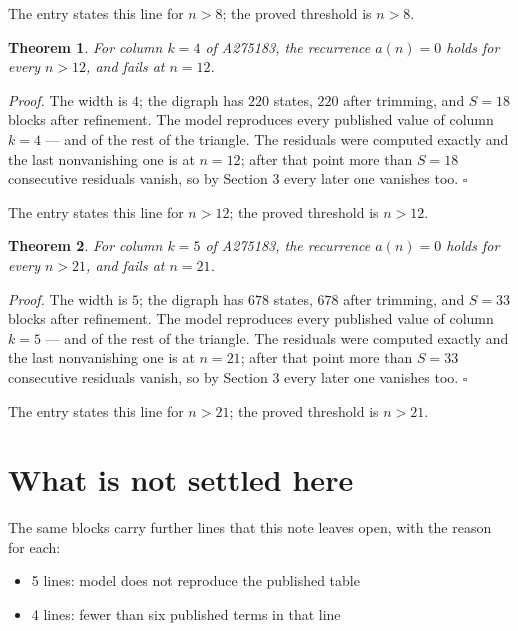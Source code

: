 \documentclass[11pt]{article}
\newtheorem{theorem}{Theorem}
\theoremstyle{definition}
\begin{document}
The entry states this line for $n > 8$; the proved threshold is $n > 8$.

\begin{theorem} For column $k = 4$ of A275183, the recurrence $a(n) = 0$ holds for every $n > 12$, and fails at $n = 12$.\end{theorem}

{\itshape Proof.} The width is $4$; the digraph has $220$ states, $220$ after trimming, and $S = 18$ blocks after refinement. The model reproduces every published value of column $k = 4$ --- and of the rest of the triangle. The residuals were computed exactly and the last nonvanishing one is at $n = 12$; after that point more than $S = 18$ consecutive residuals vanish, so by Section 3 every later one vanishes too. $\square$

The entry states this line for $n > 12$; the proved threshold is $n > 12$.

\begin{theorem} For column $k = 5$ of A275183, the recurrence $a(n) = 0$ holds for every $n > 21$, and fails at $n = 21$.\end{theorem}

{\itshape Proof.} The width is $5$; the digraph has $678$ states, $678$ after trimming, and $S = 33$ blocks after refinement. The model reproduces every published value of column $k = 5$ --- and of the rest of the triangle. The residuals were computed exactly and the last nonvanishing one is at $n = 21$; after that point more than $S = 33$ consecutive residuals vanish, so by Section 3 every later one vanishes too. $\square$

The entry states this line for $n > 21$; the proved threshold is $n > 21$.

\section{What is not settled here}

The same blocks carry further lines that this note leaves open, with the reason for each:

\begin{itemize}

\item 5 lines: model does not reproduce the published table

\item 4 lines: fewer than six published terms in that line

\end{itemize}
\end{document}
